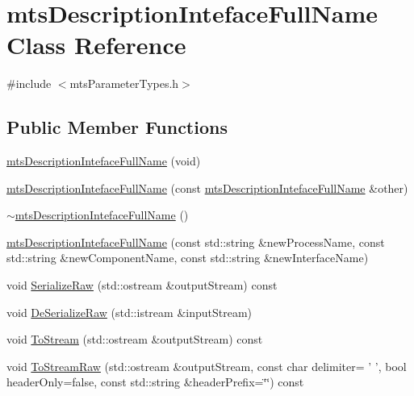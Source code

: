 \hypertarget{classmts_description_inteface_full_name}{\section{mts\-Description\-Inteface\-Full\-Name Class Reference}
\label{classmts_description_inteface_full_name}
}


{\ttfamily \#include $<$mts\-Parameter\-Types.\-h$>$}

\subsection*{Public Member Functions}
\begin{DoxyCompactItemize}
\item 
\hyperlink{classmts_description_inteface_full_name_aba738688e0226daabddf5893ca0c01bb}{mts\-Description\-Inteface\-Full\-Name} (void)
\item 
\hyperlink{classmts_description_inteface_full_name_acc4b8572e3e5222aa06f67018b89c301}{mts\-Description\-Inteface\-Full\-Name} (const \hyperlink{classmts_description_inteface_full_name}{mts\-Description\-Inteface\-Full\-Name} \&other)
\item 
\hyperlink{classmts_description_inteface_full_name_adb8dc20a07bdc738c817655cff779ac3}{$\sim$mts\-Description\-Inteface\-Full\-Name} ()
\item 
\hyperlink{classmts_description_inteface_full_name_abfb76635a4d91c2953be2ee3e2d47c3c}{mts\-Description\-Inteface\-Full\-Name} (const std\-::string \&new\-Process\-Name, const std\-::string \&new\-Component\-Name, const std\-::string \&new\-Interface\-Name)
\item 
void \hyperlink{classmts_description_inteface_full_name_aa56968ec51f0bd45242972cd8d96b1f0}{Serialize\-Raw} (std\-::ostream \&output\-Stream) const 
\item 
void \hyperlink{classmts_description_inteface_full_name_ae678e3f1ffdca5fb96b849b030b010cd}{De\-Serialize\-Raw} (std\-::istream \&input\-Stream)
\item 
void \hyperlink{classmts_description_inteface_full_name_aada59891e3b35682b6c741029ee04e1d}{To\-Stream} (std\-::ostream \&output\-Stream) const 
\item 
void \hyperlink{classmts_description_inteface_full_name_a78d76c47edc3782946d3185ec6b3c120}{To\-Stream\-Raw} (std\-::ostream \&output\-Stream, const char delimiter= ' ', bool header\-Only=false, const std\-::string \&header\-Prefix=\char`\"{}\char`\"{}) const 

\end{DoxyCompactItemize}
